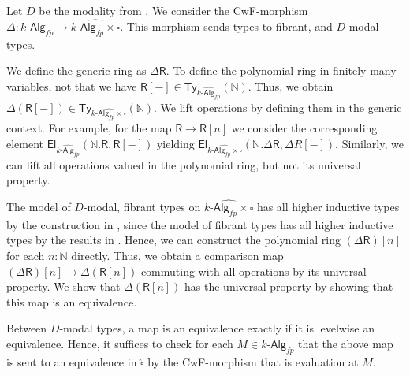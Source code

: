 \documentclass[10pt,a4paper]{article}
\newcommand{\nats}{\mathbb{N}}
\newcommand{\Alg}{\mathsf{Alg}}
\newcommand\Ty{\mathsf{Ty}}
\newcommand\El{\mathsf{El}}
\newcommand\R{\mathsf{R}}
\begin{document}
Let $D$ be the modality from \cite{CRS21}.
We consider the CwF-morphism $\Delta \colon \widehat{k\text{-}\Alg_{fp}} \to \widehat{k\text{-}\Alg_{fp} \times \square}$.
This morphism sends types to fibrant, and $D$-modal types.

We define the generic ring as $\Delta\R$.
To define the polynomial ring in finitely many variables, not that we have $\R[-] \in \Ty_{\widehat{k\text{-}\Alg_{fp}}}(\nats)$.
Thus, we obtain $\Delta(\R[-]) \in \Ty_{\widehat{k\text{-}\Alg_{fp} \times \square}}(\nats)$.
We lift operations by defining them in the generic context.
For example, for the map $\R \to \R[n]$ we consider the corresponding element $\El_{\widehat{k\text{-}\Alg_{fp}}}(\nats.\R, \R[-])$ yielding $\El_{\widehat{k\text{-}\Alg_{fp}\times \square}}(\nats.\Delta\R, \Delta R[-])$.
Similarly, we can lift all operations valued in the polynomial ring, but not its universal property.

The model of $D$-modal, fibrant types on $\widehat{k\text{-}\Alg_{fp} \times \square}$ has all higher inductive types by the construction in \cite{CRS21}, since the model of fibrant types has all higher inductive types by the results in \cite{CoquandHM18}.
Hence, we can construct the polynomial ring $(\Delta\R)[n]$ for each $n \colon \nats$ directly.
Thus, we obtain a comparison map $(\Delta\R)[n] \to \Delta(\R[n])$ commuting with all operations by its universal property.
We show that $\Delta(\R[n])$ has the universal property by showing that this map is an equivalence.

Between $D$-modal types, a map is an equivalence exactly if it is levelwise an equivalence.
Hence, it suffices to check for each $M \in k\text{-}\Alg_{fp}$ that the above map is sent to an equivalence in $\widehat{\square}$ by the CwF-morphism that is evaluation at $M$.


% 
\end{document}
